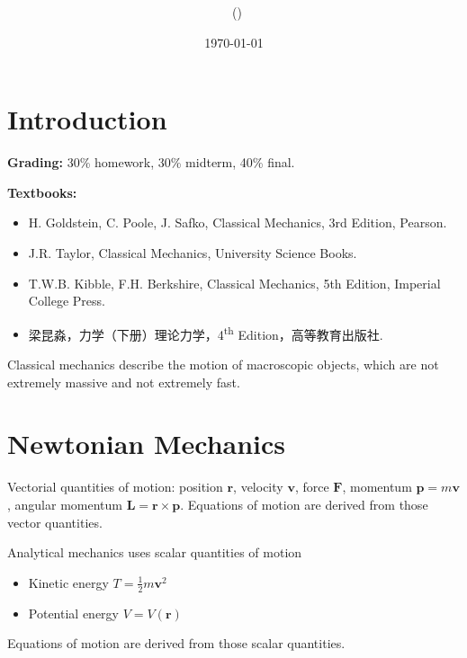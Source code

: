 \documentclass[twoside,9pt]{article}
\title{{\lms \Code \ \Ass}}
\author{\lms \name \ (\href{mailto:\mail}{\mail})}
\date{\lms \today}
\makeatletter
\numberwithin{equation}{section} %
\theoremstyle{definition}
\theoremstyle{remark}
\newtheorem*{remark}{Remark}
\renewcommand{\maketitle}{\bgroup\setlength{\parindent}{0pt}
\begin{flushleft}
  \textbf{\Large\@title}

  \@author
\end{flushleft}\egroup
}
\makeatother
\begin{document}
\maketitle
\thispagestyle{title}


\tableofcontents
\newpage

\setcounter{section}{-1}
\section{Introduction}
\textbf{Grading:} 30\% homework, 30\% midterm, 40\% final.

\textbf{Textbooks:}
\begin{itemize}
    \item H. Goldstein, C. Poole, J. Safko, Classical Mechanics,
    3rd Edition, Pearson.
    \item J.R. Taylor, Classical Mechanics, University Science Books.
    \item T.W.B. Kibble, F.H. Berkshire, Classical Mechanics, 5th Edition,
    Imperial College Press.
    \item 梁昆淼，力学（下册）理论力学，4\textsuperscript{th} Edition，高等教育出版社.
\end{itemize}

Classical mechanics describe the motion of macroscopic objects, which are
not extremely massive and not extremely fast.

\section{Newtonian Mechanics}
Vectorial quantities of motion: position $\mathbf{r}$, 
velocity $\mathbf{v}$, force $\mathbf{F}$,
momentum $\mathbf{p}=m\mathbf{v}$,
angular momentum $\mathbf{L}=\mathbf{r}\times\mathbf{p}$.
Equations of motion are derived from those vector quantities.

Analytical mechanics uses scalar quantities of motion
\begin{itemize}
    \item Kinetic energy $T = \frac{1}{2}m\mathbf{v}^2$
    \item Potential energy $V = V(\mathbf{r})$
\end{itemize}
Equations of motion are derived from those scalar quantities.
\end{document}
